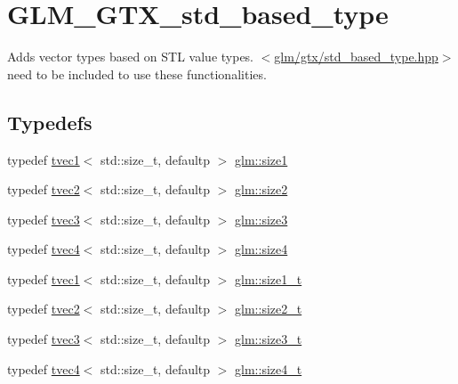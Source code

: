 \hypertarget{group__gtx__std__based__type}{}\section{G\+L\+M\+\_\+\+G\+T\+X\+\_\+std\+\_\+based\+\_\+type}
\label{group__gtx__std__based__type}


Adds vector types based on S\+TL value types. $<$\hyperlink{std__based__type_8hpp}{glm/gtx/std\+\_\+based\+\_\+type.\+hpp}$>$ need to be included to use these functionalities.  


\subsection*{Typedefs}
\begin{DoxyCompactItemize}
\item 
typedef \hyperlink{structglm_1_1tvec1}{tvec1}$<$ std\+::size\+\_\+t, defaultp $>$ \hyperlink{group__gtx__std__based__type_ga3550330d27cef40f7694130b501be73a}{glm\+::size1}
\item 
typedef \hyperlink{structglm_1_1tvec2}{tvec2}$<$ std\+::size\+\_\+t, defaultp $>$ \hyperlink{group__gtx__std__based__type_gab8b434ee2ba109726915e977c6aca22a}{glm\+::size2}
\item 
typedef \hyperlink{structglm_1_1tvec3}{tvec3}$<$ std\+::size\+\_\+t, defaultp $>$ \hyperlink{group__gtx__std__based__type_gacf3e47fc09ad812f100e13442919fc79}{glm\+::size3}
\item 
typedef \hyperlink{structglm_1_1tvec4}{tvec4}$<$ std\+::size\+\_\+t, defaultp $>$ \hyperlink{group__gtx__std__based__type_ga66a39603f01a37444de3adb28c021e79}{glm\+::size4}
\item 
typedef \hyperlink{structglm_1_1tvec1}{tvec1}$<$ std\+::size\+\_\+t, defaultp $>$ \hyperlink{group__gtx__std__based__type_ga9a9525491009d0df7bcc964b1e2e5745}{glm\+::size1\+\_\+t}
\item 
typedef \hyperlink{structglm_1_1tvec2}{tvec2}$<$ std\+::size\+\_\+t, defaultp $>$ \hyperlink{group__gtx__std__based__type_ga47b1e2bca519b02eb8500a240216b5de}{glm\+::size2\+\_\+t}
\item 
typedef \hyperlink{structglm_1_1tvec3}{tvec3}$<$ std\+::size\+\_\+t, defaultp $>$ \hyperlink{group__gtx__std__based__type_ga689991bc66c16637f043ade5cbb87260}{glm\+::size3\+\_\+t}
\item 
typedef \hyperlink{structglm_1_1tvec4}{tvec4}$<$ std\+::size\+\_\+t, defaultp $>$ \hyperlink{group__gtx__std__based__type_gaa4f69cfac1c3e014a50fd090974092ec}{glm\+::size4\+\_\+t}
\end{DoxyCompactItemize}


